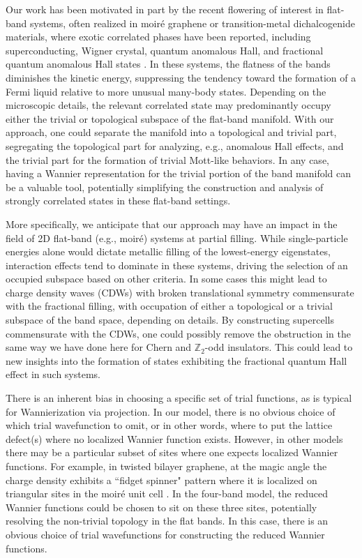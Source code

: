 \documentclass[galley,aps,pra,10pt,amsmath,amssymb,
    superscriptaddress,nofootinbib,longbibliography]{revtex4-2}
\newcounter{comm}
\begin{document}
Our work has been motivated in part by the recent flowering of interest in flat-band systems, often realized in moiré graphene or transition-metal dichalcogenide materials, where exotic correlated phases have been reported, including superconducting, Wigner crystal, quantum anomalous Hall, and fractional quantum anomalous Hall states \cite{Shayegan2022, siddharth2013, yang2024, zhao2012, kato2022, wu2007, Jaworowski2018, sheng2011}. In these systems, the flatness of the bands diminishes the kinetic energy, suppressing the tendency toward the formation of a Fermi liquid relative to more unusual many-body states. Depending on the microscopic details, the relevant correlated state may predominantly occupy either the trivial or topological subspace of the flat-band manifold. With our approach, one could separate the manifold into a topological and trivial part, segregating the topological part for analyzing, e.g., anomalous Hall effects, and the trivial part for the formation of trivial Mott-like behaviors. In any case, having a Wannier representation for the trivial portion of the band manifold can be a valuable tool, potentially simplifying the construction and analysis of strongly correlated states in these flat-band settings.

More specifically, we anticipate that our approach may have an impact in the field of 2D flat-band (e.g., moir\'e) systems at partial filling. While single-particle energies alone would dictate metallic filling of the lowest-energy eigenstates, interaction effects tend to dominate in these systems, driving the selection of an occupied subspace based on other criteria. In some cases this might lead to charge density waves (CDWs) with broken translational symmetry commensurate with the fractional filling, with occupation of either a topological or a trivial subspace of the band space, depending on details. By constructing supercells commensurate with the CDWs, one could possibly remove the obstruction in the same way we have done here for Chern and $\mathbb{Z}_2$-odd insulators. This could lead to new insights into the formation of states exhibiting the fractional quantum Hall effect in such systems. 

There is an inherent bias in choosing a specific set of trial functions, as is typical for Wannierization via projection. In our model, there is no obvious choice of which trial wavefunction to omit, or in other words, where to put the lattice defect(s) where no localized Wannier function exists. However, in other models there may be a particular subset of sites where one expects localized Wannier functions. For example, in twisted bilayer graphene, at the magic angle the charge density exhibits a ``fidget spinner" pattern where it is localized on triangular sites in the moiré unit cell \cite{Kang2018}. In the four-band model, the reduced Wannier functions could be chosen to sit on these three sites, potentially resolving the non-trivial topology in the flat bands. In this case, there is an obvious choice of trial wavefunctions for constructing the reduced Wannier functions.
\end{document}
